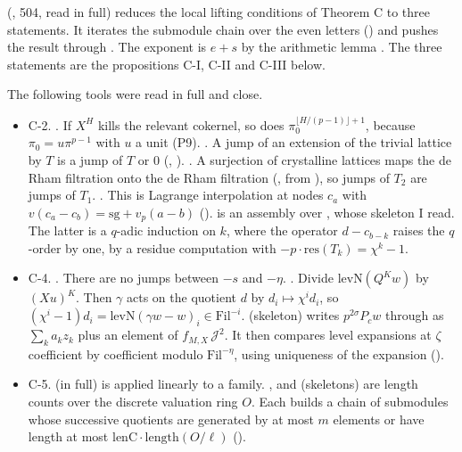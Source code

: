 \documentclass[11pt]{article}
\newcommand{\Fil}{\mathrm{Fil}}
\theoremstyle{definition}
\theoremstyle{remark}
\begin{document}
 (, 504, read in full) reduces the local lifting conditions of Theorem C to three statements. It iterates the submodule chain over the even letters () and pushes the result through . The exponent is $e+s$ by the arithmetic lemma . The three statements are the propositions C-I, C-II and C-III below.

The following tools were read in full and close.
\begin{itemize}[leftmargin=*,itemsep=1pt]
\item C-2. . If $X^H$ kills the relevant cokernel, so does $\pi_0^{\lfloor H/(p-1)\rfloor+1}$, because $\pi_0=u\pi^{p-1}$ with $u$ a unit (P9). . A jump of an extension of the trivial lattice by $T$ is a jump of $T$ or $0$ (, ). . A surjection of crystalline lattices maps the de Rham filtration onto the de Rham filtration (, from ), so jumps of $T_2$ are jumps of $T_1$. . This is Lagrange interpolation at nodes $c_a$ with $v(c_a-c_b)=\mathrm{sg}+v_p(a-b)$ ().  is an assembly over , whose skeleton I read. The latter is a $q$-adic induction on $k$, where the operator $d-c_{b-k}$ raises the $q$-order by one, by a residue computation with $-p\cdot\mathrm{res}(T_k)=\chi^k-1$.
\item C-4. . There are no jumps between $-s$ and $-\eta$. . Divide $\mathrm{levN}(Q^Kw)$ by $(Xu)^K$. Then $\gamma$ acts on the quotient $d$ by $d_i\mapsto\chi^id_i$, so $(\chi^i-1)d_i=\mathrm{levN}(\gamma w-w)_i\in\Fil^{-i}$.  (skeleton) writes $p^{2\sigma}P_cw$ through  as $\sum_ka_kz_k$ plus an element of $f_{M,X}\,\mathcal J^2$. It then compares level expansions at $\zeta$ coefficient by coefficient modulo $\Fil^{-\eta}$, using uniqueness of the expansion ().
\item C-5.  (in full) is  applied linearly to a family. ,  and  (skeletons) are length counts over the discrete valuation ring $O$. Each builds a chain of submodules whose successive quotients are generated by at most $m$ elements or have length at most $\mathrm{lenC}\cdot\mathrm{length}(O/\ell)$ ().

\end{itemize}
\end{document}
